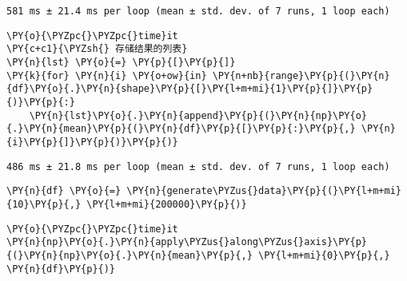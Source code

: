     \begin{Verbatim}[commandchars=\\\{\}]
581 ms ± 21.4 ms per loop (mean ± std. dev. of 7 runs, 1 loop each)
    \end{Verbatim}

    \begin{tcolorbox}[breakable, size=fbox, boxrule=1pt, pad at break*=1mm,colback=cellbackground, colframe=cellborder]
\begin{Verbatim}[commandchars=\\\{\}]
\PY{o}{\PYZpc{}\PYZpc{}time}it
\PY{c+c1}{\PYZsh{} 存储结果的列表}
\PY{n}{lst} \PY{o}{=} \PY{p}{[}\PY{p}{]}
\PY{k}{for} \PY{n}{i} \PY{o+ow}{in} \PY{n+nb}{range}\PY{p}{(}\PY{n}{df}\PY{o}{.}\PY{n}{shape}\PY{p}{[}\PY{l+m+mi}{1}\PY{p}{]}\PY{p}{)}\PY{p}{:}
    \PY{n}{lst}\PY{o}{.}\PY{n}{append}\PY{p}{(}\PY{n}{np}\PY{o}{.}\PY{n}{mean}\PY{p}{(}\PY{n}{df}\PY{p}{[}\PY{p}{:}\PY{p}{,} \PY{n}{i}\PY{p}{]}\PY{p}{)}\PY{p}{)}
\end{Verbatim}
\end{tcolorbox}

    \begin{Verbatim}[commandchars=\\\{\}]
486 ms ± 21.8 ms per loop (mean ± std. dev. of 7 runs, 1 loop each)
    \end{Verbatim}

    \begin{tcolorbox}[breakable, size=fbox, boxrule=1pt, pad at break*=1mm,colback=cellbackground, colframe=cellborder]
\begin{Verbatim}[commandchars=\\\{\}]
\PY{n}{df} \PY{o}{=} \PY{n}{generate\PYZus{}data}\PY{p}{(}\PY{l+m+mi}{10}\PY{p}{,} \PY{l+m+mi}{200000}\PY{p}{)}
\end{Verbatim}
\end{tcolorbox}

    \begin{tcolorbox}[breakable, size=fbox, boxrule=1pt, pad at break*=1mm,colback=cellbackground, colframe=cellborder]
\begin{Verbatim}[commandchars=\\\{\}]
\PY{o}{\PYZpc{}\PYZpc{}time}it
\PY{n}{np}\PY{o}{.}\PY{n}{apply\PYZus{}along\PYZus{}axis}\PY{p}{(}\PY{n}{np}\PY{o}{.}\PY{n}{mean}\PY{p}{,} \PY{l+m+mi}{0}\PY{p}{,} \PY{n}{df}\PY{p}{)}
\end{Verbatim}
\end{tcolorbox}

